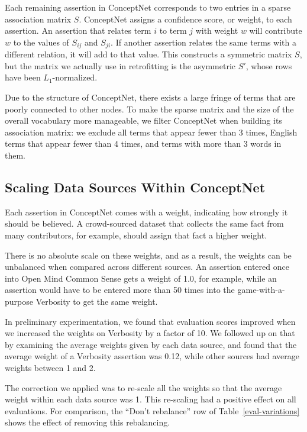 \documentclass[11pt,letterpaper]{article}
\begin{document}
Each remaining assertion in ConceptNet corresponds to two entries in a sparse
association matrix $S$. ConceptNet assigns a confidence score, or weight, to
each assertion. An assertion that relates term $i$ to term $j$ with weight $w$
will contribute $w$ to the values of $S_{ij}$ and $S_{ji}$. If another
assertion relates the same terms with a different relation, it will add to that
value. This constructs a symmetric matrix $S$, but the matrix we actually use
in retrofitting is the asymmetric $S'$, whose rows have been $L_1$-normalized.

Due to the structure of ConceptNet, there exists a large fringe of terms that are
poorly connected to other nodes. To make the sparse matrix and the size of the
overall vocabulary more manageable, we filter ConceptNet when building its
association matrix: we exclude all terms that appear fewer than 3 times, English
terms that appear fewer than 4 times, and terms with more than 3 words in them.

\subsection{Scaling Data Sources Within ConceptNet}

Each assertion in ConceptNet comes with a weight, indicating how strongly it
should be believed. A crowd-sourced dataset that collects the same fact from
many contributors, for example, should assign that fact a higher weight.

There is no absolute scale on these weights, and as a result, the weights can
be unbalanced when compared across different sources. An assertion entered once
into Open Mind Common Sense gets a weight of 1.0, for example, while an
assertion would have to be entered more than 50 times into the
game-with-a-purpose Verbosity to get the same weight.

In preliminary experimentation, we found that evaluation scores improved when
we increased the weights on Verbosity by a factor of 10. We followed up on that
by examining the average weights given by each data source, and found that the
average weight of a Verbosity assertion was 0.12, while other sources had
average weights between 1 and 2.

The correction we applied was to re-scale all the weights so that the average
weight within each data source was 1. This re-scaling had a positive effect
on all evaluations. For comparison, the ``Don't rebalance'' row of
Table~\ref{eval-variations} shows the effect of removing this rebalancing.
\end{document}
